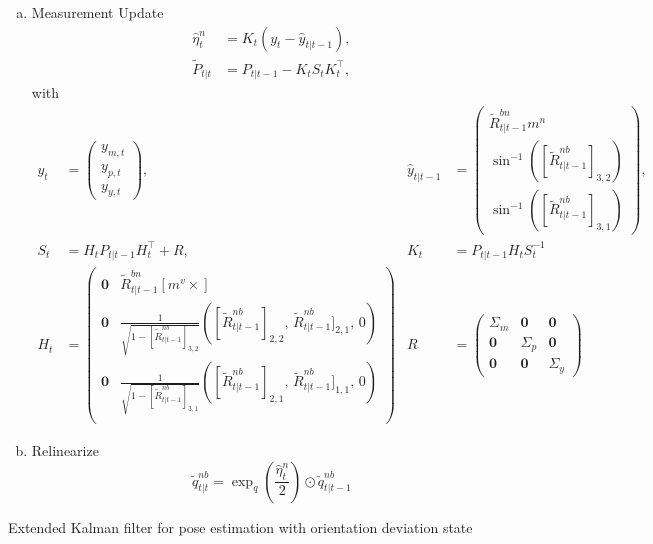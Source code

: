 \documentclass{article}
\begin{document}
\begin{algorithm}
{\begin{enumerate}[(a)]
\begin{align*}
\begin{pmatrix}
    \mathbf{0} &\mathbf{0}  &I_3
    \end{pmatrix}. 
\end{align*}
      \item Measurement Update
      \begin{align}
          \hat{\eta}_t^n &= K_t \left( y_t - \hat{y}_{t|t-1} \right),\\
          \tilde{P}_{t|t} &= P_{t | t-1} - K_t S_t K_t^\top,
      \end{align}
with
    \begin{align*}
        y_t &= \begin{pmatrix}
        y_{m,t} \\
        y_{p,t} \\
        y_{y,t}
        \end{pmatrix},&
        \hat{y}_{t|t-1}  &= \begin{pmatrix}
        \tilde{R}_{t | t-1}^{bn}  m^n\\
        \sin^{-1} \left([\tilde{R}_{t | t-1}^{nb}]_{3,2}\right)\\
        \sin^{-1} \left([\tilde{R}_{t | t-1}^{nb}]_{3,1}\right)
        \end{pmatrix},\\
        S_t &= H_t P_{t | t-1} H_t^\top + R,&
        K_t &= P_{t | t-1} H_t S_{t}^{-1}\\
        H_t &= \begin{pmatrix}
        \mathbf{0} &\tilde{R}_{t | t-1}^{bn} [m^v \times]\\
        \mathbf{0} & \frac{1}{\sqrt{1 - [\tilde{R}_{t | t-1}^{nb}]_{3,2}}} \left([\tilde{R}_{t | t-1}^{nb}]_{2,2}, \, \tilde{R}_{t | t-1}^{nb}]_{2,1},\, 0 \right)\\
         \mathbf{0} & \frac{1}{\sqrt{1 - [\tilde{R}_{t | t-1}^{nb}]_{3,1}}} \left([\tilde{R}_{t | t-1}^{nb}]_{2,1},\, \tilde{R}_{t | t-1}^{nb}]_{1,1},\, 0 \right)\\
        \end{pmatrix}&
        R &= \begin{pmatrix}
        \Sigma_m &\mathbf{0} &\mathbf{0}\\
        \mathbf{0} & \Sigma_p &\mathbf{0}\\
        \mathbf{0} &\mathbf{0} & \Sigma_y 
        \end{pmatrix}
    \end{align*}
    \item Relinearize
    \begin{equation}
        \tilde{q}_{t | t}^{nb} = \exp_q \left( \frac{\hat{\eta}_t^n}{2}\right) \odot \tilde{q}_{t | t -1}^{nb}
    \end{equation}
  \end{enumerate}
}
\caption{Extended Kalman filter for pose estimation with orientation deviation state}
\label{algo:max}
\end{algorithm}
\end{document}
